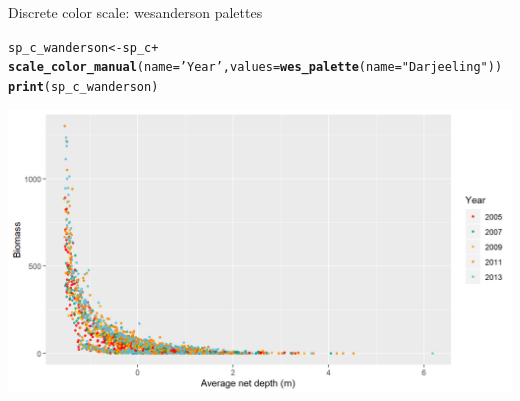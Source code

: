 \documentclass{beamer}\usepackage[]{graphicx}\usepackage[]{color}
\makeatletter
\newcommand{\hlstr}[1]{\textcolor[rgb]{0.192,0.494,0.8}{#1}}%
\newcommand{\hlopt}[1]{\textcolor[rgb]{0,0,0}{#1}}%
\newcommand{\hlstd}[1]{\textcolor[rgb]{0.345,0.345,0.345}{#1}}%
\newcommand{\hlkwb}[1]{\textcolor[rgb]{0.69,0.353,0.396}{#1}}%
\newcommand{\hlkwc}[1]{\textcolor[rgb]{0.333,0.667,0.333}{#1}}%
\newcommand{\hlkwd}[1]{\textcolor[rgb]{0.737,0.353,0.396}{\textbf{#1}}}%
\newenvironment{kframe}{%
 \def\at@end@of@kframe{}%
 \ifinner\ifhmode%
  \def\at@end@of@kframe{\end{minipage}}%
  \begin{minipage}{\columnwidth}%
 \fi\fi%
 \def\FrameCommand##1{\hskip\@totalleftmargin \hskip-\fboxsep
 \colorbox{shadecolor}{##1}\hskip-\fboxsep
     \hskip-\linewidth \hskip-\@totalleftmargin \hskip\columnwidth}%
 \MakeFramed {\advance\hsize-\width
   \@totalleftmargin\z@ \linewidth\hsize
   \@setminipage}}%
 {\par\unskip\endMakeFramed%
 \at@end@of@kframe}
\newenvironment{knitrout}{}{} %
\makeatother
\begin{document}
\begin{frame}[fragile]{Discrete color scale: wesanderson palettes}
\begin{knitrout}\footnotesize
{}\color{fgcolor}\begin{kframe}
\begin{alltt}
\hlstd{sp_c_wanderson} \hlkwb{<-} \hlstd{sp_c} \hlopt{+}
  \hlkwd{scale_color_manual}\hlstd{(}\hlkwc{name}\hlstd{=}\hlstr{'Year'}\hlstd{,} \hlkwc{values}\hlstd{=}\hlkwd{wes_palette}\hlstd{(}\hlkwc{name}\hlstd{=}\hlstr{"Darjeeling"}\hlstd{))}
\hlkwd{print}\hlstd{(sp_c_wanderson)}
\end{alltt}
\end{kframe}

{\centering \includegraphics[width=.9\linewidth]{figure/sp_discrete_color_wa2-1} 

}



\end{knitrout}
\end{frame}

\end{document}
